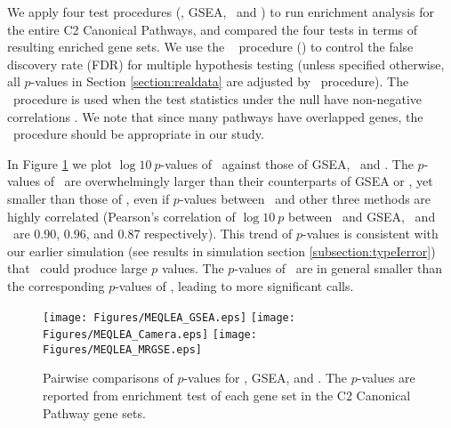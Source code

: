 	We apply four test procedures (\OurMethod, GSEA, \CMT~and \genr) to run enrichment analysis 
	for	the entire C2 Canonical Pathways, and compared the four tests in terms of resulting
	enriched gene sets. %
	We use the \FDR~\citep{benjamini1995controlling} procedure (\FDRabb) to control the false
	discovery rate (FDR) for multiple hypothesis testing (unless specified otherwise, all 
	$p$-values in Section \ref{section:realdata} are adjusted by \FDRabb~procedure). The 
	\FDRabb~procedure is used when the test statistics under the null have non-negative 
	correlations \citep{benjamini2001control}. We note that since many pathways have overlapped 
	genes, the \FDRabb~procedure should be appropriate in our study.
	
	In Figure \ref{fig:HDdatap} we plot $\log 10~p$-values of \OurMethod~against those of GSEA, 
	\CMT~and \genr.
	The $p$-values of \CMT~are overwhelmingly larger than their counterparts of GSEA or \OurMethod, 
	yet smaller than those of \genr, even 
	if $p$-values between \OurMethod~and other three methods are highly correlated (Pearson's 
	correlation of $\log 10 ~p$ between \OurMethod~and GSEA, \CMT~and \genr~are 0.90, 0.96, and 
	0.87 respectively). This trend of $p$-values is consistent with our earlier simulation (see 
	results in simulation section \ref{subsection:typeIerror}) that
	\CMT~could produce large $p$ values. The $p$-values of \genr~are in general smaller than the 
	corresponding $p$-values of \OurMethod, leading to more significant calls. 
	
	\begin{figure}[h!]
		\begin{center}
			\texttt{[image: Figures/MEQLEA\_GSEA.eps]}
			\texttt{[image: Figures/MEQLEA\_Camera.eps]}
			\texttt{[image: Figures/MEQLEA\_MRGSE.eps]}
		\end{center} 
		\caption[Pairwise comparisons of $p$-values for different methods]{Pairwise comparisons of 
		$p$-values for \OurMethod, GSEA, \CMT and \genr. The $p$-values 
		are reported from enrichment test of each gene set in the C2 Canonical Pathway gene sets.
		}\label{fig:HDdatap}
	\end{figure} 
	
